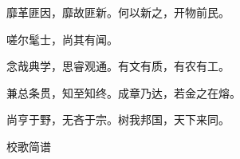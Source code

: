 \documentclass[UTF8]{ctexart}  %
\begin{document}
\qquad \qquad 靡革匪因，靡故匪新。何以新之，开物前民。

\qquad \qquad 嗟尔髦士，尚其有闻。

\vspace{1em}

\qquad \qquad 念哉典学，思睿观通。有文有质，有农有工。

\qquad \qquad 兼总条贯，知至知终。成章乃达，若金之在熔。

\qquad \qquad 尚亨于野，无吝于宗。树我邦国，天下来同。



\newpage

\begin{flushleft}
    \textsf{校歌简谱}
\end{flushleft}

{
    \renewcommand{\newpage}{}
    
}

\newpage

{
    \renewcommand{\newpage}{}
    
}

\end{document}
